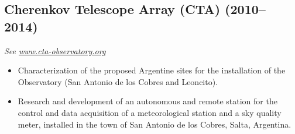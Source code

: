 \subsection*{Cherenkov Telescope Array (CTA) (2010--2014)}
{\small{\textit{See \href{http://www.cta-observatory.org}{www.cta-observatory.org}}}}
\begin{itemize}
\item Characterization of the proposed Argentine sites for the installation of the Observatory (San Antonio de los Cobres and Leoncito).
\item Research and development of an autonomous and remote station for the control and data acquisition of a meteorological station and a sky quality meter, installed in the town of San Antonio de los Cobres, Salta, Argentina.
\end{itemize}


